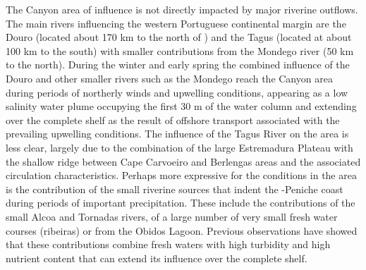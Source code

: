 
The \naz Canyon area of influence is not directly impacted by major
riverine outflows. The main rivers influencing the western Portuguese
continental margin are the Douro (located about 170 km to the north of
\naze) and the Tagus (located at about 100 km to the south) with
smaller contributions from the Mondego river (50 km to the
north). During the winter and early spring the combined influence of
the Douro and other smaller rivers such as the Mondego reach the \naz
Canyon area during periods of northerly winds and upwelling
conditions, appearing as a low salinity water plume occupying the
first 30 m of the water column and extending over the complete shelf
as the result of offshore transport associated with the prevailing
upwelling conditions. The influence of the Tagus River on the area is
less clear, largely due to the combination of the large Estremadura
Plateau with the shallow ridge between Cape Carvoeiro and Berlengas
areas and the associated circulation characteristics. Perhaps more
expressive for the conditions in the area is the contribution of the
small riverine sources that indent the \naze-Peniche coast during
periods of important precipitation. These include the contributions of
the small Alcoa and Tornadas rivers, of a large number of very small
fresh water courses (ribeiras) or from the Obidos Lagoon. Previous
observations have showed \cite{martins10} that these contributions
combine fresh waters with high turbidity and high nutrient content
that can extend its influence over the complete shelf.


